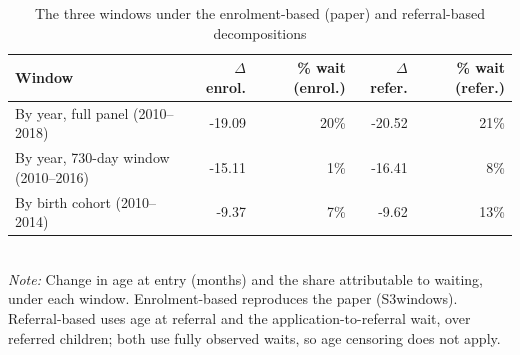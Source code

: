 \begin{table}[htbp]\centering
\caption{The three windows under the enrolment-based (paper) and referral-based decompositions}
\label{tab:D5}
\footnotesize
\setlength{\tabcolsep}{4pt}
\begin{tabular}{lrrrr}
\toprule
Window & $\Delta$ enrol. & \% wait (enrol.) & $\Delta$ refer. & \% wait (refer.) \\
\midrule
By year, full panel (2010--2018) & -19.09 & 20\% & -20.52 & 21\% \\
By year, 730-day window (2010--2016) & -15.11 & 1\% & -16.41 & 8\% \\
By birth cohort (2010--2014) & -9.37 & 7\% & -9.62 & 13\% \\
\bottomrule
\end{tabular}
\\[3pt]{\footnotesize \textit{Note:} Change in age at entry (months) and the share attributable to waiting, under each window. Enrolment-based reproduces the paper (S3windows). Referral-based uses age at referral and the application-to-referral wait, over referred children; both use fully observed waits, so age censoring does not apply.}
\end{table}
